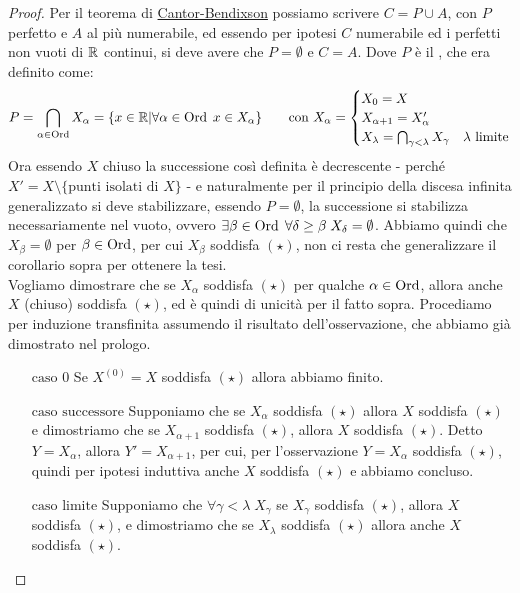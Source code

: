 \begin{proof}
	Per il teorema di \hyperref[Cantor_Bendixson]{Cantor-Bendixson} possiamo scrivere $C = P \cup A$, con $P$ perfetto e $A$ al più numerabile, ed essendo per ipotesi $C$ numerabile ed i perfetti non vuoti di $\mathbb R$ continui,
	si deve avere che $P = \emptyset$ e $C = A$. Dove $P$ è il , che era definito come:
	\[ P = \bigcap_{\alpha \in \operatorname{Ord}}X_\alpha = \{x \in \mathbb R |\forall \alpha \in\operatorname{Ord} \; x \in X_\alpha \} \qquad \text{con }X_\alpha = \begin{cases}
		X_0 = X \\
		X_{\alpha + 1} = X'_\alpha \\
		X_\lambda = \bigcap_{\gamma < \lambda}X_\gamma &\text{$\lambda$ limite}
	\end{cases}
		\]
	Ora essendo $X$ chiuso la successione così definita è decrescente - perché $X' = X\setminus\{\text{punti isolati di $X$}\}$ - e naturalmente per il principio della discesa infinita generalizzato si deve stabilizzare,
	essendo $P = \emptyset$, la successione si stabilizza necessariamente nel vuoto, ovvero $\exists \beta \in \operatorname{Ord} \; \forall \delta \geq \beta \; X_\delta = \emptyset$. Abbiamo quindi che $X_\beta = \emptyset$ per $\beta \in \operatorname{Ord}$, per cui $X_\beta$ soddisfa $(\star)$, non ci resta che generalizzare il corollario sopra per ottenere la tesi.\\
	Vogliamo dimostrare che se $X_\alpha$ soddisfa $(\star)$ per qualche $\alpha \in \operatorname{Ord}$, allora anche $X$ (chiuso) soddisfa $(\star)$, ed è quindi di unicità per il fatto sopra. Procediamo per induzione transfinita assumendo il risultato dell'osservazione, che abbiamo già dimostrato nel prologo.
	\begin{itemize}
		\item[$\boxed{\text{caso 0}}$] Se $X^{(0)} = X$ soddisfa $(\star)$ allora abbiamo finito.
		\item[$\boxed{\text{caso successore}}$] Supponiamo che se $X_\alpha$ soddisfa $(\star)$ allora $X$ soddisfa $(\star)$ e dimostriamo che se $X_{\alpha+1}$ soddisfa $(\star)$, allora $X$ soddisfa $(\star)$.
		Detto $Y = X_\alpha$, allora $Y' = X_{\alpha + 1}$, per cui, per l'osservazione $Y = X_\alpha$ soddisfa $(\star)$, quindi per ipotesi induttiva anche $X$ soddisfa $(\star)$ e abbiamo concluso.
		\item[$\boxed{\text{caso limite}}$] Supponiamo che $\forall \gamma < \lambda \; X_\gamma$ se $X_\gamma$ soddisfa $(\star)$, allora $X$ soddisfa $(\star)$, e dimostriamo che se $X_\lambda$ soddisfa $(\star)$ allora anche $X$ soddisfa $(\star)$.\\

\end{itemize}
\end{proof}
